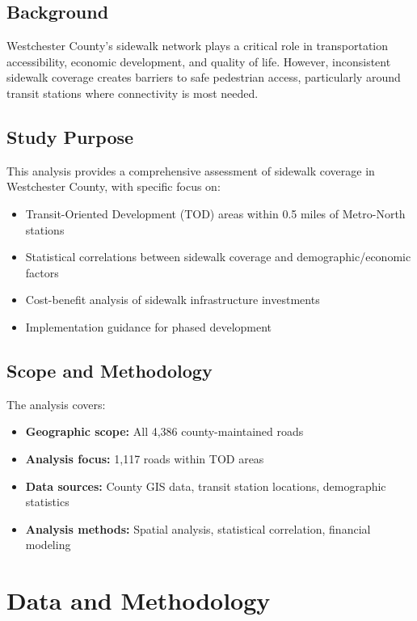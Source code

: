 \documentclass[11pt,letterpaper]{report}
\begin{document}
\section{Background}

Westchester County's sidewalk network plays a critical role in transportation accessibility, economic development, and quality of life. However, inconsistent sidewalk coverage creates barriers to safe pedestrian access, particularly around transit stations where connectivity is most needed.

\section{Study Purpose}

This analysis provides a comprehensive assessment of sidewalk coverage in Westchester County, with specific focus on:
\begin{itemize}
    \item Transit-Oriented Development (TOD) areas within 0.5 miles of Metro-North stations
    \item Statistical correlations between sidewalk coverage and demographic/economic factors
    \item Cost-benefit analysis of sidewalk infrastructure investments
    \item Implementation guidance for phased development
\end{itemize}

\section{Scope and Methodology}

The analysis covers:
\begin{itemize}
    \item \textbf{Geographic scope:} All 4,386 county-maintained roads
    \item \textbf{Analysis focus:} 1,117 roads within TOD areas
    \item \textbf{Data sources:} County GIS data, transit station locations, demographic statistics
    \item \textbf{Analysis methods:} Spatial analysis, statistical correlation, financial modeling
\end{itemize}

\chapter{Data and Methodology}
\end{document}

